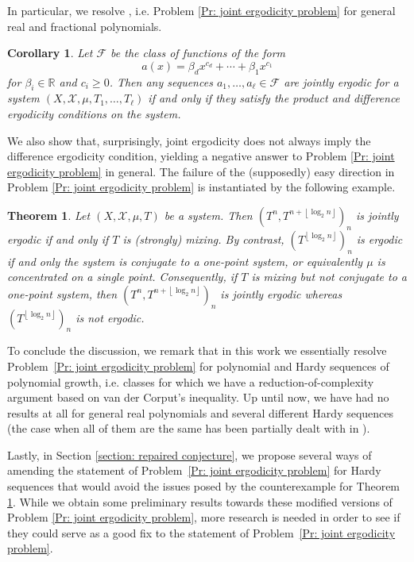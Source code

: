 \documentclass[11pt]{amsart}
\newtheorem{theorem}[lemma]{Theorem}
\newtheorem{corollary}[lemma]{Corollary}
\theoremstyle{definition}
\newcommand{\R}{{\mathbb R}}
\newcommand{\CF}{{\mathcal F}}
\newcommand{\CX}{{\mathcal X}}
\newcommand{\1}{{\mathbf{1}}}
\newcommand{\floor}[1]{{\left \lfloor #1 \right \rfloor}}
\begin{document}
In particular, we resolve \cite[Conjecture 6.1]{BMR20}, i.e. Problem \ref{Pr: joint ergodicity problem} {for general real and fractional polynomials}.
\begin{corollary}
    Let $\CF$ be the class of functions of the form $$a(x) = \beta_d x^{c_d} + \cdots + \beta_1 x^{c_1}$$ for $\beta_i\in\R$ and $c_i\geq 0$. Then any sequences $a_1, \ldots, a_\ell\in \CF$ are jointly ergodic for a system $(X, \CX, \mu, T_1, \ldots, T_\ell)$ if and only  if they satisfy the product and difference ergodicity conditions on the system. 
\end{corollary}

We also show that, surprisingly, joint ergodicity does not always imply the difference ergodicity condition, yielding a negative answer to Problem \ref{Pr: joint ergodicity problem} in general. The failure of the (supposedly) easy direction in Problem \ref{Pr: joint ergodicity problem} is instantiated by the following example. 
\begin{theorem}\label{T: counterexample}
    Let $(X, \CX, \mu, T)$ be a system. Then $(T^n, T^{n+\floor{\log_2 n}})_n$ is jointly ergodic if and only if $T$ is (strongly) mixing. By contrast, $(T^{\floor{\log_2 n}})_n$ is ergodic if and only the system is conjugate to a one-point system, or equivalently $\mu$ is concentrated on a single point. Consequently, if $T$ is mixing but not conjugate to a one-point system, then $(T^n, T^{n+\floor{\log_2 n}})_n$ is jointly ergodic whereas $(T^{\floor{\log_2 n}})_n$ is not ergodic.
\end{theorem}

To conclude the discussion, we remark that in this work we essentially resolve Problem~\ref{Pr: joint ergodicity problem} for polynomial and Hardy sequences of polynomial growth, i.e. classes for which we have a reduction-of-complexity argument based on van der Corput's inequality. Up until now, we have had no results at all for general real polynomials and several different Hardy sequences (the case when all of them are the same has been partially dealt with in \cite{DKS22, DKS23}).

Lastly, in Section \ref{section: repaired conjecture}, we propose several ways of amending the statement of Problem~\ref{Pr: joint ergodicity problem} for Hardy sequences that would avoid the issues posed by the counterexample for Theorem \ref{T: counterexample}. While we obtain some preliminary results towards these modified  versions of Problem \ref{Pr: joint ergodicity problem}, more research is needed in order to see if they could serve as a good fix to the statement of Problem~\ref{Pr: joint ergodicity problem}.
\end{document}
